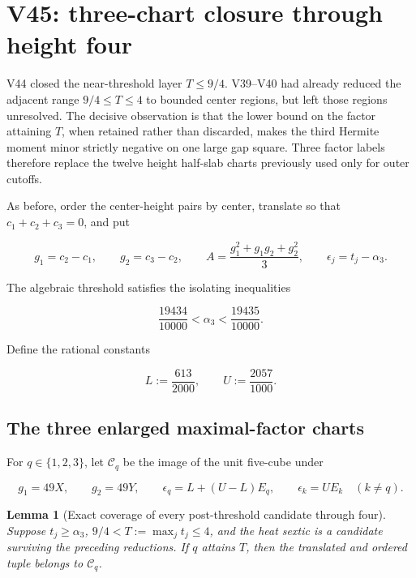 \documentclass[11pt]{article}
\newtheorem{lemma}[theorem]{Lemma}
\theoremstyle{definition}
\theoremstyle{remark}
\begin{document}
\section{V45: three-chart closure through height four}
\label{sec:f2v45-through-four}

V44 closed the near-threshold layer \(T\leq9/4\).  V39--V40 had already
reduced the adjacent range \(9/4\leq T\leq4\) to bounded center regions,
but left those regions unresolved.  The decisive observation is that the
lower bound on the factor attaining \(T\), when retained rather than
discarded, makes the third Hermite moment minor strictly negative on one
large gap square.  Three factor labels therefore replace the twelve
height half-slab charts previously used only for outer cutoffs.

As before, order the center-height pairs by center, translate so that
\(c_1+c_2+c_3=0\), and put

\[
 g_1=c_2-c_1,\qquad g_2=c_3-c_2,\qquad
 A=\frac{g_1^2+g_1g_2+g_2^2}{3},\qquad
 \epsilon_j=t_j-\alpha_3.
\tag{N45.1}
\]

The algebraic threshold satisfies the isolating inequalities

\[
 \frac{19434}{10000}<\alpha_3<\frac{19435}{10000}.
\tag{N45.2}
\]

Define the rational constants

\[
 L:=\frac{613}{2000},\qquad
 U:=\frac{2057}{1000}.
\tag{N45.3}
\]

\subsection{The three enlarged maximal-factor charts}

For \(q\in\{1,2,3\}\), let \(\mathcal C_q\) be the image of the unit
five-cube under

\[
 g_1=49X,\qquad g_2=49Y,\qquad
 \epsilon_q=L+(U-L)E_q,\qquad
 \epsilon_k=U E_k\quad(k\neq q).
\tag{N45.4}
\]

\begin{lemma}[Exact coverage of every post-threshold candidate through four]
\label{lem:f2v45-cover}
Suppose \(t_j\geq\alpha_3\), \(9/4<T:=\max_jt_j\leq4\), and the heat
sextic is a candidate surviving the preceding reductions.  If \(q\)
attains \(T\), then the translated and ordered tuple belongs to
\(\mathcal C_q\).
\end{lemma}
\end{document}
